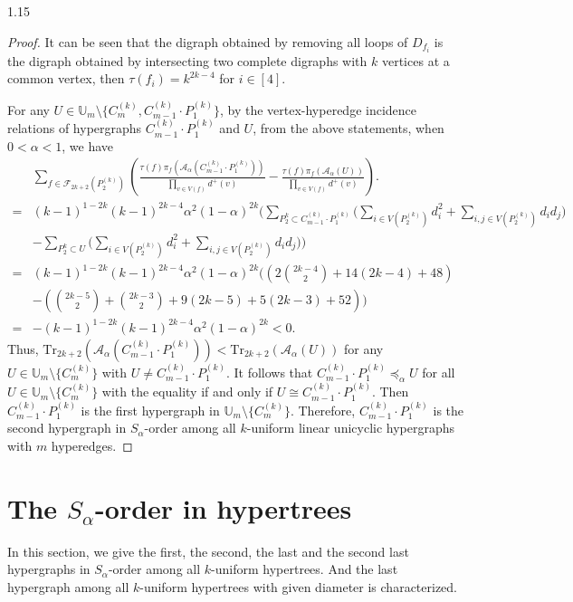\documentclass[preprint,12pt]{elsarticle1}
\numberwithin{equation}{section}
\begin{document}
\begin{spacing}{1.15}
\begin{proof}
It can be seen that the digraph obtained by removing all loops of $D_{f_i}$ is the digraph obtained by intersecting two complete digraphs with $k$ vertices at a common vertex, then $\tau(f_i)=k^{2k-4}$ for $i\in[4]$.

For any $U\in\mathbb{U}_{m}\setminus\{C_{m}^{(k)},C_{m-1}^{(k)}\cdot P_{1}^{(k)}\}$, by the vertex-hyperedge incidence relations of hypergraphs $C_{m-1}^{(k)}\cdot P_{1}^{(k)}$ and $U$, from the above statements,
when $0<\alpha<1$, we have
\begin{align*}
&\sum\limits_{f\in\mathcal{F}_{2k+2}(P_2^{(k)})}\left( \frac{\tau(f)\pi_{f}(\mathcal{A}_{\alpha}(C_{m-1}^{(k)}\cdot P_{1}^{(k)}))}{\prod\limits_{v\in V(f)}d^{+}(v)} - \frac{\tau(f)\pi_{f}(\mathcal{A}_{\alpha}(U))}{\prod\limits_{v\in V(f)}d^{+}(v)} \right).\\
=&(k-1)^{1-2k}(k-1)^{2k-4} \alpha^{2}(1-\alpha)^{2k} \Bigg( \sum\limits_{P_{2}^{k}\subset C_{m-1}^{(k)}\cdot P_{1}^{(k)}}\bigg( \sum\limits_{i\in V(P_{2}^{(k)})}d_i^2+\sum\limits_{i,j\in V(P_{2}^{(k)})}d_i d_j \bigg)\\
&-\sum\limits_{P_{2}^{k}\subset U}\bigg( \sum\limits_{i\in V(P_{2}^{(k)})}d_i^2+\sum\limits_{i,j\in V(P_{2}^{(k)})}d_i d_j \bigg) \Bigg)\\
=&(k-1)^{1-2k}(k-1)^{2k-4} \alpha^{2}(1-\alpha)^{2k} \Bigg( \left( 2\binom{2k-4}{2}+14(2k-4)+48 \right)\\
&-\left( \binom{2k-5}{2}+\binom{2k-3}{2}+9(2k-5)+5(2k-3)+52 \right) \Bigg)\\
=&-(k-1)^{1-2k}(k-1)^{2k-4}\alpha^{2}(1-\alpha)^{2k}<0.
\end{align*}
Thus, $\mathrm{Tr}_{2k+2}(\mathcal{A}_{\alpha}(C_{m-1}^{(k)}\cdot P_{1}^{(k)}))<\mathrm{Tr}_{2k+2}(\mathcal{A}_{\alpha}(U))$ for any $U\in\mathbb{U}_{m}\setminus\{C_{m}^{(k)}\}$ with $U\neq C_{m-1}^{(k)}\cdot P_{1}^{(k)}$.
It follows that $C_{m-1}^{(k)}\cdot P_{1}^{(k)}\preceq_{\alpha}U$ for all $U\in\mathbb{U}_{m}\setminus\{C_{m}^{(k)}\}$ with the equality if and only if $U\cong C_{m-1}^{(k)}\cdot P_{1}^{(k)}$.
Then $C_{m-1}^{(k)}\cdot P_{1}^{(k)}$ is the first hypergraph in $\mathbb{U}_{m}\setminus\{C_{m}^{(k)}\}$.
Therefore, $C_{m-1}^{(k)}\cdot P_{1}^{(k)}$ is the second hypergraph in $S_{\alpha}$-order among all $k$-uniform linear unicyclic hypergraphs with $m$ hyperedges.
\end{proof}




\section{The $S_{\alpha}$-order in hypertrees}
In this section, we give the first, the second, the last and the second last hypergraphs in $S_{\alpha}$-order among all $k$-uniform hypertrees.
And the last hypergraph among all $k$-uniform hypertrees with given diameter is characterized.


\end{spacing}
\end{document}
